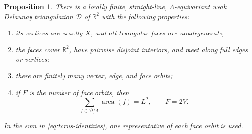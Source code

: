 \documentclass[11pt,a4paper]{article}
\newtheorem{proposition}[theorem]{Proposition}
\theoremstyle{definition}
\theoremstyle{remark}
\newcommand{\R}{\mathbb{R}}
\DeclareMathOperator{\area}{area}
\begin{document}
\begin{proposition}
\label{prop:triangulation}
There is a locally finite, straight-line, $\Lambda$-equivariant weak
Delaunay triangulation $\mathcal D$ of $\R^2$ with the following properties:
\begin{enumerate}
\item[(i)] its vertices are exactly $X$, and all triangular faces are
nondegenerate;
\item[(ii)] the faces cover $\R^2$, have pairwise disjoint interiors, and
meet along full edges or vertices;
\item[(iii)] there are finitely many vertex, edge, and face orbits;
\item[(iv)] if $F$ is the number of face orbits, then
\begin{equation}
\label{eq:torus-identities}
\sum_{f\in\mathcal D/\Lambda}\area(f)=L^2,
\qquad F=2V.
\end{equation}
\end{enumerate}
In the sum in \eqref{eq:torus-identities}, one representative of each face
orbit is used.
\end{proposition}
\end{document}
